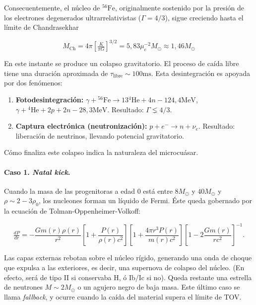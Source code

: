 Consecuentemente, el núcleo de $\phantom{}^{56}\mbox{Fe}$, originalmente sostenido por la presión de los electrones degenerados ultrarrelativistas ($\Gamma=4/3$), sigue creciendo hasta el límite de Chandrasekhar

\begin{equation}
  M_{\mbox{Ch}}=4\pi \left[\tfrac{K}{\pi G}\right]^{3/2}=5,83\mu_e^{-2}M_{\odot}\approx 1,46 M_{\odot}
\end{equation}

\noindent En este instante se produce un colapso gravitatorio. El proceso de caída libre tiene una duración aproximada de $\tau_{\mbox{libre}}\sim100\mbox{ms}$. Esta desintegración es apoyada por dos fenómenos:

\begin{enumerate}
  \item \textbf{Fotodesintegración:} $\gamma+\phantom{}^{56}\mbox{Fe}\to13\phantom{}^4\mbox{He}+4n-124,4\mbox{MeV}$, $\gamma+\phantom{}^{4}\mbox{He}+2p+2n-28,3\mbox{MeV}$. Resultado: $\Gamma\lneq 4/3$.
  \item \textbf{Captura electrónica (neutronización):} $p+e^-\to n+\nu_e$. Resultado: liberación de neutrinos, llevando potencial gravitatorio.
\end{enumerate}

\noindent Cómo finaliza este colapso indica la naturaleza del microcuásar.

\paragraph{Caso 1. \textit{Natal kick}.} Cuando la masa de las progenitoras a edad $0$ está entre $8M_{\odot}$ y $40M_{\odot}$ y $\rho\sim 2-3\rho_0$, los nucleones forman un líquido de Fermi. Éste queda gobernado por la ecuación de Tolman-Oppenheimer-Volkoff:

\begin{equation}
  \tfrac{dP}{dr}=-\frac{Gm(r)\rho(r)}{r^2}\left[1+\frac{P(r)}{\rho(r)c^2}\right]\left[1+\frac{4\pi r^3 P(r)}{m(r)c^2}\right]\left[1-2\frac{Gm(r)}{rc^2}\right]^{-1}.
\end{equation}

\noindent Las capas externas rebotan sobre el núcleo rígido, generando una onda de choque que expulsa a las exteriores, es decir, una supernova de colapso del núcleo. (En efecto, será de tipo II si conservaba $\mbox{H}$, ó Ib/Ic si no). Queda restante una estrella de neutrones $M\sim2M_{\odot}$ o un agujero negro de baja masa. Este último caso se llama \textit{fallback}, y ocurre cuando la caída del material supera el límite de TOV.

